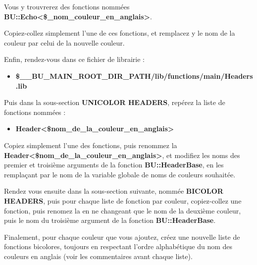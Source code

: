 \documentclass[a4paper,10pt]{article}
\begin{document}
\begin{justify}
	Vous y trouvrerez des fonctions nommées \textbf{\color{mauve}BU::Echo<\$\_nom\_couleur\_en\_anglais>}.
\end{justify} 

\begin{justify}
Copiez-collez simplement l'une de ces fonctions, et remplacez y le nom de la couleur par celui de la nouvelle couleur.\\[1\baselineskip]
\end{justify}

\begin{justify}
	Enfin, rendez-vous dans ce fichier de librairie :
	
	\begin{itemize}	
		\item \textbf{\color{orange}\$\_\_BU\_MAIN\_ROOT\_DIR\_PATH\color{lime}/lib/functions/main/Headers.lib}
	\end{itemize}	
\end{justify}	

\begin{justify}
	Puis dans la sous-section \textbf{UNICOLOR HEADERS}, repérez la liste de fonctions nommées :

	\begin{itemize}
    	\item \textbf{\color{mauve}Header<\$nom\_de\_la\_couleur\_en\_anglais>}
	\end{itemize}
\end{justify}

\begin{justify}
	Copiez simplement l'une des fonctions, puis renommez la \textbf{\color{mauve}Header<\$nom\_de\_la\_couleur\_en\_anglais>},
et modifiez les noms des premier et troisième arguments de la fonction \textbf{\color{mauve}BU::HeaderBase}, en les
remplaçant par le nom de la variable globale de noms de couleurs souhaitée.
\end{justify}

\begin{justify}
	Rendez vous ensuite dans la sous-section suivante, nommée \textbf{BICOLOR HEADERS}, puis pour chaque liste de fonction par couleur, copiez-collez une fonction, puis renomez la en ne changeant que le nom de la deuxième couleur, puis le nom du troisième argument de la fonction \textbf{\color{mauve}BU::HeaderBase}.
\end{justify}

\begin{justify}
	Finalement, pour chaque couleur que vous ajoutez, créez une nouvelle liste de fonctions bicolores,
toujours en respectant l'ordre alphabétique du nom des couleurs en anglais (voir les commentaires
avant chaque liste).
\end{justify}
\end{document}
